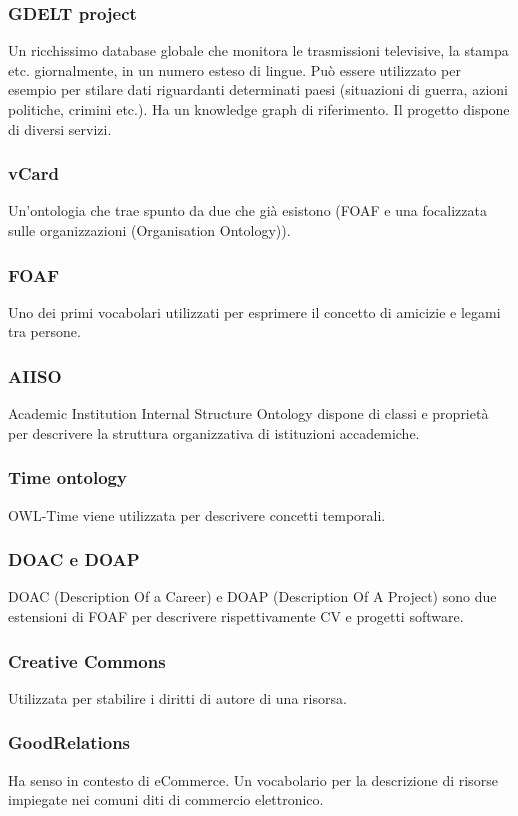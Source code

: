 \subsubsection{GDELT project}
Un ricchissimo database globale che monitora le trasmissioni televisive, la stampa etc. giornalmente, in un numero esteso di lingue. Può essere utilizzato per esempio per stilare dati riguardanti determinati paesi (situazioni di guerra, azioni politiche, crimini etc.). Ha un knowledge graph di riferimento. Il progetto dispone di diversi servizi.

\subsubsection{vCard}
Un'ontologia che trae spunto da due che già esistono (FOAF e una focalizzata sulle organizzazioni (Organisation Ontology)).

\subsubsection{FOAF}
Uno dei primi vocabolari utilizzati per esprimere il concetto di amicizie e legami tra persone.

\subsubsection{AIISO}
Academic Institution Internal Structure Ontology dispone di classi e proprietà per descrivere la struttura organizzativa di istituzioni accademiche.

\subsubsection{Time ontology}
OWL-Time viene utilizzata per descrivere concetti temporali.

\subsubsection{DOAC e DOAP}
DOAC (Description Of a Career) e DOAP (Description Of A Project) sono due estensioni di FOAF per descrivere rispettivamente CV e progetti software.

\subsubsection{Creative Commons}
Utilizzata per stabilire i diritti di autore di una risorsa.

\subsubsection{GoodRelations}
Ha senso in contesto di eCommerce. Un vocabolario per la descrizione di risorse impiegate nei comuni diti di commercio elettronico.
